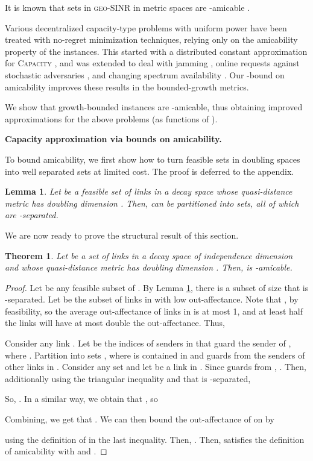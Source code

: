 \documentclass[11pt]{amsart}
\newcounter{foo}
\newtheorem{theorem}[foo]{Theorem}
\newtheorem{lemma}{Lemma}[section]
\newcommand{\prob}[1]{\textsc{#1}}
\newcommand{\Capacity}{\prob{Capacity}}
\newcommand{\capacity}{\Capacity}
\newcommand{\geomodel}{\textsc{geo-SINR}}
\newcommand{\mypara}[1]{\smallskip\noindent\textbf{#1.}}  \newcommand{\tightpara}[1]{\noindent\textbf{#1.}}  \newcommand{\inddim}{D}
\begin{document}
It is known that sets in {\geomodel} in metric spaces are -amicable \cite{infocom11}.


Various decentralized capacity-type problems with uniform power have been treated with no-regret minimization techniques, relying only on the amicability property of the instances. This started with a distributed constant approximation for {\capacity} \cite{Dinitz2010,infocom11}, and was extended to deal with jamming \cite{dams2013jamming}, online requests against stochastic adversaries \cite{GHKSV13}, and changing spectrum availability \cite{dams2013sleeping}.
Our -bound on amicability improves these results in 
the bounded-growth metrics.

We show that growth-bounded instances are -amicable,
thus obtaining improved approximations for the above problems (as
functions of ).

\mypara{Capacity approximation via bounds on amicability}

To bound amicability, we first show how to turn feasible
sets in doubling spaces into well separated sets at 
limited cost. The proof is deferred to the appendix.

\begin{lemma}
  Let  be a feasible set of links in a decay space whose
  quasi-distance metric has doubling dimension .  Then,  can be
  partitioned into  sets, all of which are
  -separated.
\label{lem:planar_separation}
\end{lemma}

We are now ready to prove the structural result of this section.

\begin{theorem}
  Let  be a set of links in a decay space of independence dimension
   and whose quasi-distance metric has doubling dimension
  .  Then,  is -amicable.
\label{thm:indep}
\end{theorem}

\begin{proof}
Let  be any feasible subset of .
By Lemma \ref{lem:planar_separation}, there is a subset
 of size  that is 
-separated.
Let  be the subset of links in
 with low out-affectance.
Note that , by feasibility,
so the average
out-affectance of links in  is at most 1, and at least half
the links will have at most double the out-affectance.
Thus, 



Consider any link .  Let 
be the indices of senders in  that guard the sender  of
, where . Partition  into sets 
, where  is contained in  and guards
 from the senders of other links in .
Consider any set  and let  be a link in .
Since  guards  from , .
Then, additionally using the triangular inequality and that  is -separated,

So, 
.
In a similar way, we obtain that
  ,
so 
 
Combining, we get that 
.
We can then bound the out-affectance of  on  by

using the definition of  in the last inequality.
Then, .
Then,  satisfies the definition of amicability with  and .
\end{proof}
\end{document}
